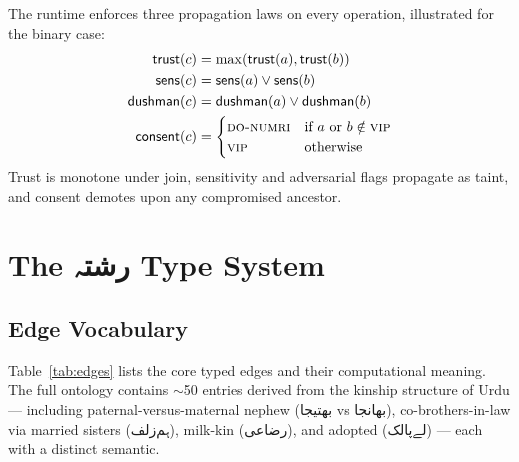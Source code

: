 \documentclass[10pt,twocolumn]{article}
\newcommand{\ur}[1]{{\urdufont #1}}
\begin{document}
The runtime enforces three propagation laws on every operation, illustrated for the binary case:
\begin{align*}
\mathsf{trust}(c)       &= \max(\mathsf{trust}(a), \mathsf{trust}(b)) \\
\mathsf{sens}(c)        &= \mathsf{sens}(a) \vee \mathsf{sens}(b) \\
\mathsf{dushman}(c)     &= \mathsf{dushman}(a) \vee \mathsf{dushman}(b) \\
\mathsf{consent}(c)     &= \begin{cases}
  \textsc{do-numri} & \text{if } a \text{ or } b \notin \textsc{vip} \\
  \textsc{vip} & \text{otherwise}
\end{cases}
\end{align*}
Trust is monotone under join, sensitivity and adversarial flags propagate as taint, and consent demotes upon any compromised ancestor.

\section{The \ur{رشتہ} Type System}
\label{sec:typesystem}

\subsection{Edge Vocabulary}

Table~\ref{tab:edges} lists the core typed edges and their computational meaning. The full ontology contains $\sim$50 entries derived from the kinship structure of Urdu — including paternal-versus-maternal nephew (\ur{بھتیجا} vs \ur{بھانجا}), co-brothers-in-law via married sisters (\ur{ہم‌زلف}), milk-kin (\ur{رضاعی}), and adopted (\ur{لے‌پالک}) — each with a distinct semantic.
\end{document}
